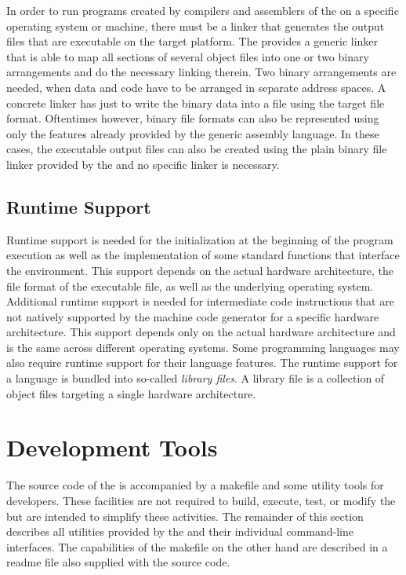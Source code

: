 In order to run programs created by compilers and assemblers of the \ecs{} on a specific operating system or machine,
there must be a linker that generates the output files that are executable on the target platform.
The \ecs{} provides a generic linker that is able to map all sections of several object files into one or two binary arrangements and do the necessary linking therein.
Two binary arrangements are needed, when data and code have to be arranged in separate address spaces.
A concrete linker has just to write the binary data into a file using the target file format.
Oftentimes however, binary file formats can also be represented using only the features already provided by the generic assembly language.
In these cases, the executable output files can also be created using the plain binary file linker provided by the \ecs{} and no specific linker is necessary.

\subsection{Runtime Support}

Runtime support is needed for the initialization at the beginning of the program execution as well as the implementation of some standard functions that interface the environment.
This support depends on the actual hardware architecture, the file format of the executable file, as well as the underlying operating system.
Additional runtime support is needed for intermediate code instructions that are not natively supported by the machine code generator for a specific hardware architecture.
This support depends only on the actual hardware architecture and is the same across different operating systems.
Some programming languages may also require runtime support for their language features.
The runtime support for a language is bundled into so-called \emph{library files}.
A library file is a collection of object files targeting a single hardware architecture.

\section{Development Tools}

The source code of the \ecs{} is accompanied by a makefile and some utility tools for developers.
These facilities are not required to build, execute, test, or modify the \ecs{} but are intended to simplify these activities.
The remainder of this section describes all utilities provided by the \ecs{} and their individual command-line interfaces.
The capabilities of the makefile on the other hand are described in a readme file also supplied with the source code.

